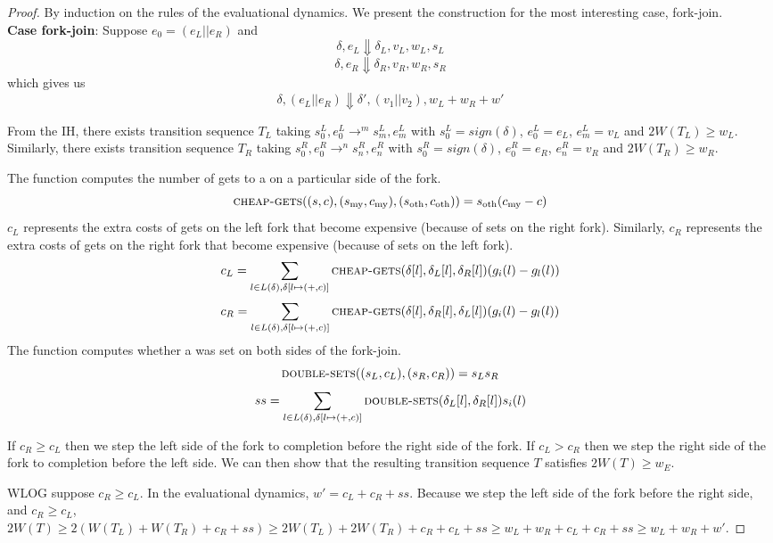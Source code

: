 \begin{proof}
By induction on the rules of the evaluational dynamics. We present the construction for the most interesting case, fork-join.
\\

\noindent\textbf{Case fork-join}: Suppose $e_0 = (e_L || e_R)$ and
$$\delta, e_L \Downarrow \delta_L, v_L, w_L, s_L$$
$$\delta, e_R \Downarrow \delta_R, v_R, w_R, s_R$$
which gives us
$$\delta, (e_L || e_R) \Downarrow \delta', (v_1 || v_2), w_L + w_R + w'$$

From the IH, there exists transition sequence $T_L$ taking $s^L_0, e^L_0 \to^m s^L_m, e^L_m$ with $s^L_0 = sign(\delta)$, $e^L_0 = e_L$, $e^L_m = v_L$ and $2W(T_L) \geq w_L$. Similarly, there exists transition sequence $T_R$ taking $s^R_0, e^R_0 \to^n s^R_n, e^R_n$ with $s^R_0 = sign(\delta)$, $e^R_0 = e_R$, $e^R_n = v_R$ and $2W(T_R) \geq w_R$. 

The function  computes the number of gets to a \farray{} on a particular side of the fork.
$$\text{{\sc cheap-gets}}((s, c), (s_{\text{my}}, c_{\text{my}}), (s_{\text{oth}}, c_{\text{oth}})) = s_{\text{oth}} (c_{\text{my}} - c)$$
$c_L$ represents the extra costs of gets on the left fork that become expensive (because of sets on the right fork). Similarly, $c_R$ represents the extra costs of gets on the right fork that become expensive (because of sets on the left fork).
$$c_L = \sum_{l \in L(\delta), \delta[l \mapsto (+, c)]} \text{{\sc cheap-gets}}(\delta[l], \delta_L[l], \delta_R[l]) (g_i(l) - g_l(l))$$
$$c_R = \sum_{l \in L(\delta), \delta[l \mapsto (+, c)]} \text{{\sc cheap-gets}}(\delta[l], \delta_R[l], \delta_L[l]) (g_i(l) - g_l(l))$$
The function  computes whether a \farray{} was set on both sides of the fork-join.
$$\text{{\sc double-sets}}((s_L, c_L), (s_R, c_R)) = s_L s_R$$
$$ss = \sum_{l \in L(\delta), \delta[l \mapsto (+, c)]} \text{{\sc double-sets}}(\delta_L[l], \delta_R[l])s_i(l)$$

If $c_R \geq c_L$ then we step the left side of the fork to completion before the right side of the fork. If $c_L > c_R$ then we step the right side of the fork to completion before the left side. We can then show that the resulting transition sequence $T$ satisfies $2W(T) \geq w_E$.

WLOG suppose $c_R \geq c_L$. In the evaluational dynamics, $w' = c_L + c_R + ss$. Because we step the left side of the fork before the right side, and $c_R \geq c_L$, $2W(T) \geq 2(W(T_L) + W(T_R) + c_R + ss) \geq 2W(T_L) + 2W(T_R) + c_R + c_L + ss \geq w_L + w_R + c_L + c_R + ss \geq w_L + w_R + w'$.

\end{proof}

